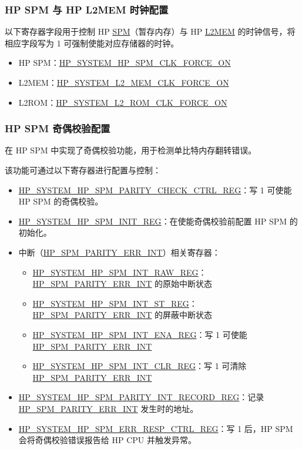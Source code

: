 \documentclass[main\_\_CN.tex]{subfiles}
\begin{document}
\subsubsection{HP SPM 与 HP L2MEM 时钟配置}

以下寄存器字段用于控制 HP \hyperref[mod:sysmem]{SPM}（暂存内存）与 HP \hyperref[mod:sysmem]{L2MEM} 的时钟信号，将相应字段写为 1 可强制使能对应存储器的时钟。
\begin{itemize}
    \item HP SPM：\hyperref[fielddesc:HPSYSTEMHPSPMCLKFORCEON]{HP\_SYSTEM\_HP\_SPM\_CLK\_FORCE\_ON}
    \item L2MEM：\hyperref[fielddesc:HPSYSTEML2MEMCLKFORCEON]{HP\_SYSTEM\_L2\_MEM\_CLK\_FORCE\_ON}
    \item L2ROM：\hyperref[fielddesc:HPSYSTEML2ROMCLKFORCEON]{HP\_SYSTEM\_L2\_ROM\_CLK\_FORCE\_ON}
\end{itemize}


\subsubsection{HP SPM 奇偶校验配置}

\chipname{} 在 HP SPM 中实现了奇偶校验功能，用于检测单比特内存翻转错误。

该功能可通过以下寄存器进行配置与控制：
\begin{itemize}
    \item \hyperref[regdesc:HPSYSTEMHPSPMPARITYCHECKCTRLREG]{HP\_SYSTEM\_HP\_SPM\_PARITY\_CHECK\_CTRL\_REG}：写 1 可使能 HP SPM 的奇偶校验。
    \item \hyperref[regdesc:HPSYSTEMHPSPMINITREG]{HP\_SYSTEM\_HP\_SPM\_INIT\_REG}：在使能奇偶校验前配置 HP SPM 的初始化。
    \item 中断（\hyperref[tab:sysreg-int-sources]{HP\_SPM\_PARITY\_ERR\_INT}）相关寄存器：
    \begin{itemize}
        \item \hyperref[regdesc:HPSYSTEMHPSPMINTRAWREG]{HP\_SYSTEM\_HP\_SPM\_INT\_RAW\_REG}：\hyperref[tab:sysreg-int-sources]{HP\_SPM\_PARITY\_ERR\_INT} 的原始中断状态
        \item \hyperref[regdesc:HPSYSTEMHPSPMINTSTREG]{HP\_SYSTEM\_HP\_SPM\_INT\_ST\_REG}：\hyperref[tab:sysreg-int-sources]{HP\_SPM\_PARITY\_ERR\_INT} 的屏蔽中断状态
        \item \hyperref[regdesc:HPSYSTEMHPSPMINTENAREG]{HP\_SYSTEM\_HP\_SPM\_INT\_ENA\_REG}：写 1 可使能 \hyperref[tab:sysreg-int-sources]{HP\_SPM\_PARITY\_ERR\_INT}
        \item \hyperref[regdesc:HPSYSTEMHPSPMINTCLRREG]{HP\_SYSTEM\_HP\_SPM\_INT\_CLR\_REG}：写 1 可清除 \hyperref[tab:sysreg-int-sources]{HP\_SPM\_PARITY\_ERR\_INT}
    \end{itemize}
    \item \hyperref[regdesc:HPSYSTEMHPSPMPARITYINTRECORDREG]{HP\_SYSTEM\_HP\_SPM\_PARITY\_INT\_RECORD\_REG}：记录 \hyperref[tab:sysreg-int-sources]{HP\_SPM\_PARITY\_ERR\_INT} 发生时的地址。
    \item \hyperref[regdesc:HPSYSTEMHPSPMERRRESPCTRLREG]{HP\_SYSTEM\_HP\_SPM\_ERR\_RESP\_CTRL\_REG}：写 1 后，HP SPM 会将奇偶校验错误报告给 HP CPU 并触发异常。
\end{itemize}
\end{document}
